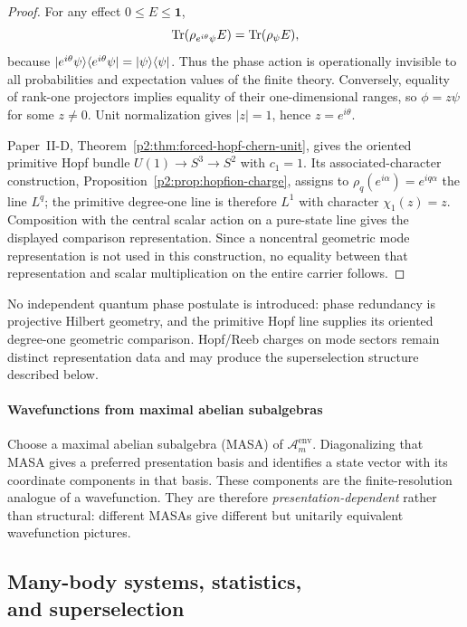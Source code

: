 \documentclass[12pt,a4paper]{article}
\begin{document}
\begin{proof}
For any effect \(0\le E\le\mathbf1\),
\[
\operatorname{Tr}(\rho_{e^{i\theta}\psi}E)=\operatorname{Tr}(\rho_\psi E),
\]
because \(\lvert e^{i\theta}\psi \rangle\langle e^{i\theta}\psi \rvert=\lvert \psi \rangle\langle \psi \rvert\).
Thus the phase action is operationally invisible to all probabilities and expectation values of the finite theory.
Conversely, equality of rank-one projectors implies equality of their
one-dimensional ranges, so \(\phi=z\psi\) for some \(z\ne0\).  Unit
normalization gives \(|z|=1\), hence \(z=e^{i\theta}\).

Paper~II-D, Theorem~\ref{p2:thm:forced-hopf-chern-unit}, gives the oriented
primitive Hopf bundle \(U(1)\to S^3\to S^2\) with \(c_1=1\).
Its associated-character construction,
Proposition~\ref{p2:prop:hopfion-charge}, assigns to
\(\rho_q(e^{i\alpha})=e^{iq\alpha}\) the line \(L^q\); the primitive
degree-one line is therefore \(L^1\) with character \(\chi_1(z)=z\).
Composition with the central scalar action on a pure-state line gives the
displayed comparison representation.  Since a noncentral geometric mode
representation is not used in this construction, no equality between that
representation and scalar multiplication on the entire carrier follows.
\end{proof}

No independent quantum phase postulate is introduced: phase redundancy is
projective Hilbert geometry, and the primitive Hopf line supplies its oriented
degree-one geometric comparison.  Hopf/Reeb charges on mode sectors remain
distinct representation data and may produce the superselection structure
described below.



\paragraph{Wavefunctions from maximal abelian subalgebras}
\label{p4:sec:part2-wavefunctions}

Choose a maximal abelian subalgebra (MASA) of $\mathcal A_m^{\mathrm{env}}$.
Diagonalizing that MASA gives a preferred presentation basis and identifies a state vector with its coordinate components in that basis.
These components are the finite-resolution analogue of a wavefunction.
They are therefore \emph{presentation-dependent} rather than structural: different MASAs give different but unitarily equivalent wavefunction pictures.



\subsection[Many-body systems, statistics, and superselection]
{Many-body systems, statistics,\\ and superselection}
\label{p4:sec:part2-manybody}
\end{document}
